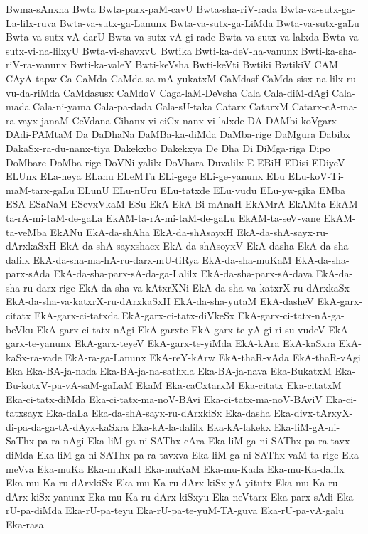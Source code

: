 {Bwma-sAnxna
Bwta
Bwta-parx-paM-cavU
Bwta-sha-riV-rada
Bwta-va-sutx-ga-La-lilx-ruva
Bwta-va-sutx-ga-Lanunx
Bwta-va-sutx-ga-LiMda
Bwta-va-sutx-gaLu
Bwta-va-sutx-vA-darU
Bwta-va-sutx-vA-gi-rade
Bwta-va-sutx-va-lalxda
Bwta-va-sutx-vi-na-lilxyU
Bwta-vi-shavxvU
Bwtika
Bwti-ka-deV-ha-vanunx
Bwti-ka-sha-riV-ra-vanunx
Bwti-ka-valeY
Bwti-keVsha
Bwti-keVti
Bwtiki
BwtikiV
CAM
CAyA-tapw
Ca
CaMda
CaMda-sa-mA-yukatxM
CaMdasf
CaMda-sisx-na-lilx-ru-vu-da-riMda
CaMdasusx
CaMdoV
Caga-laM-DeVsha
Cala
Cala-diM-dAgi
Cala-mada
Cala-ni-yama
Cala-pa-dada
Cala-sU-taka
Catarx
CatarxM
Catarx-cA-ma-ra-vayx-janaM
CeVdana
Cihanx-vi-ciCx-nanx-vi-lalxde
DA
DAMbi-koVgarx
DAdi-PAMtaM
Da
DaDhaNa
DaMBa-ka-diMda
DaMba-rige
DaMgura
Dabibx
DakaSx-ra-du-nanx-tiya
Dakekxbo
Dakekxya
De
Dha
Di
DiMga-riga
Dipo
DoMbare
DoMba-rige
DoVNi-yalilx
DoVhara
Duvalilx
E
EBiH
EDisi
EDiyeV
ELUnx
ELa-neya
ELanu
ELeMTu
ELi-gege
ELi-ge-yanunx
ELu
ELu-koV-Ti-maM-tarx-gaLu
ELunU
ELu-nUru
ELu-tatxde
ELu-vudu
ELu-yw-gika
EMba
ESA
ESaNaM
ESevxVkaM
ESu
EkA
EkA-Bi-mAnaH
EkAMrA
EkAMta
EkAM-ta-rA-mi-taM-de-gaLa
EkAM-ta-rA-mi-taM-de-gaLu
EkAM-ta-seV-vane
EkAM-ta-veMba
EkANu
EkA-da-shAha
EkA-da-shAsayxH
EkA-da-shA-sayx-ru-dArxkaSxH
EkA-da-shA-sayxshacx
EkA-da-shAsoyxV
EkA-dasha
EkA-da-sha-dalilx
EkA-da-sha-ma-hA-ru-darx-mU-tiRya
EkA-da-sha-muKaM
EkA-da-sha-parx-sAda
EkA-da-sha-parx-sA-da-ga-Lalilx
EkA-da-sha-parx-sA-dava
EkA-da-sha-ru-darx-rige
EkA-da-sha-va-kAtxrXNi
EkA-da-sha-va-katxrX-ru-dArxkaSx
EkA-da-sha-va-katxrX-ru-dArxkaSxH
EkA-da-sha-yutaM
EkA-dasheV
EkA-garx-citatx
EkA-garx-ci-tatxda
EkA-garx-ci-tatx-diVkeSx
EkA-garx-ci-tatx-nA-ga-beVku
EkA-garx-ci-tatx-nAgi
EkA-garxte
EkA-garx-te-yA-gi-ri-su-vudeV
EkA-garx-te-yanunx
EkA-garx-teyeV
EkA-garx-te-yiMda
EkA-kAra
EkA-kaSxra
EkA-kaSx-ra-vade
EkA-ra-ga-Lanunx
EkA-reY-kArw
EkA-thaR-vAda
EkA-thaR-vAgi
Eka
Eka-BA-ja-nada
Eka-BA-ja-na-sathxla
Eka-BA-ja-nava
Eka-BukatxM
Eka-Bu-kotxV-pa-vA-saM-gaLaM
EkaM
Eka-caCxtarxM
Eka-citatx
Eka-citatxM
Eka-ci-tatx-diMda
Eka-ci-tatx-ma-noV-BAvi
Eka-ci-tatx-ma-noV-BAviV
Eka-ci-tatxsayx
Eka-daLa
Eka-da-shA-sayx-ru-dArxkiSx
Eka-dasha
Eka-divx-tArxyX-di-pa-da-ga-tA-dAyx-kaSxra
Eka-kA-la-dalilx
Eka-kA-lakekx
Eka-liM-gA-ni-SaThx-pa-ra-nAgi
Eka-liM-ga-ni-SAThx-cAra
Eka-liM-ga-ni-SAThx-pa-ra-tavx-diMda
Eka-liM-ga-ni-SAThx-pa-ra-tavxva
Eka-liM-ga-ni-SAThx-vaM-ta-rige
Eka-meVva
Eka-muKa
Eka-muKaH
Eka-muKaM
Eka-mu-Kada
Eka-mu-Ka-dalilx
Eka-mu-Ka-ru-dArxkiSx
Eka-mu-Ka-ru-dArx-kiSx-yA-yitutx
Eka-mu-Ka-ru-dArx-kiSx-yanunx
Eka-mu-Ka-ru-dArx-kiSxyu
Eka-neVtarx
Eka-parx-sAdi
Eka-rU-pa-diMda
Eka-rU-pa-teyu
Eka-rU-pa-te-yuM-TA-guva
Eka-rU-pa-vA-galu
Eka-rasa
}
